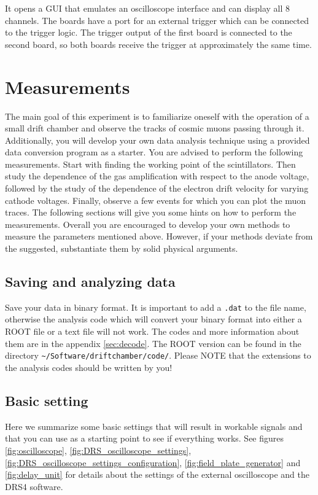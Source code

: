 \documentclass[12pt]{article}
\begin{document}
 It opens a GUI that emulates an oscilloscope interface and can display all 8 channels. The boards have a port for an external trigger which can be connected to the trigger logic. The trigger output of the first board is connected to the second board, so both boards receive the trigger at approximately the same time.

\section{Measurements}
The main goal of this experiment is to familiarize oneself with the operation of a small drift chamber and observe the tracks of cosmic muons passing through it. Additionally, you will develop your own data analysis technique using a provided data conversion program as a starter. You are advised to perform the following measurements. Start with finding the working point of the scintillators. Then study the dependence of the gas amplification with respect to the anode voltage, followed by the study of the dependence of the electron drift velocity for varying cathode voltages. Finally, observe a few events for which you can plot the muon traces. The following sections will give you some hints on how to perform the measurements. Overall you are encouraged to develop your own methods to measure the parameters mentioned above. However, if your methods deviate from the suggested, substantiate them by solid physical arguments. 

\subsection{Saving and analyzing data}
Save your data in binary format. It is important to add a \verb|.dat| to the file name, otherwise the analysis code which will convert your binary format into either a ROOT file or a text file will not work. The codes and more information about them are in the appendix \ref{sec:decode}. The ROOT version can be found in the directory \verb|~/Software/driftchamber/code/|. Please NOTE that the extensions to the analysis codes should be written by you! 

\subsection{Basic setting}
Here we summarize some basic settings that will result in workable signals and that you can use as a starting point to see if everything works. See figures \ref{fig:oscilloscope}, \ref{fig:DRS_oscilloscope_settings}, \ref{fig:DRS_oscilloscope_settings_configuration}, \ref{fig:field_plate_generator} and \ref{fig:delay_unit} for details about the settings of the external oscilloscope and the DRS4 software.
\end{document}
